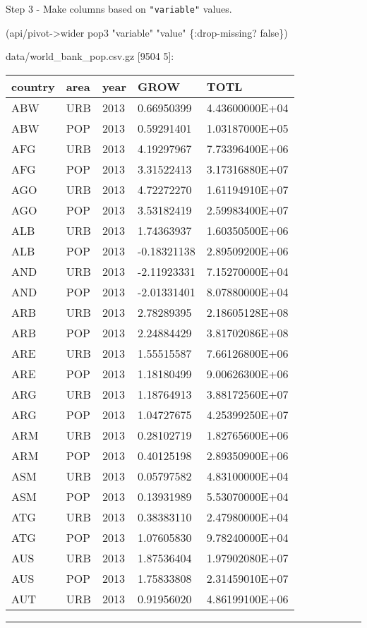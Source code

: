 \documentclass[]{article}
\newenvironment{Shaded}{\begin{snugshade}}{\end{snugshade}}
\newcommand{\AttributeTok}[1]{\textcolor[rgb]{0.77,0.63,0.00}{#1}}
\newcommand{\NormalTok}[1]{#1}
\newcommand{\StringTok}[1]{\textcolor[rgb]{0.31,0.60,0.02}{#1}}
\newcommand{\VariableTok}[1]{\textcolor[rgb]{0.00,0.00,0.00}{#1}}
\begin{document}
Step 3 - Make columns based on \texttt{"variable"} values.

\begin{Shaded}
\begin{Highlighting}[]
\NormalTok{(api/pivot->wider pop3 }\StringTok{"variable"} \StringTok{"value"}\NormalTok{ \{}\AttributeTok{:drop-missing}\NormalTok{? }\VariableTok{false}\NormalTok{\})}
\end{Highlighting}
\end{Shaded}

data/world\_bank\_pop.csv.gz {[}9504 5{]}:

\begin{longtable}[]{@{}lllll@{}}
\toprule
country & area & year & GROW & TOTL\tabularnewline
\midrule
\endhead
ABW & URB & 2013 & 0.66950399 & 4.43600000E+04\tabularnewline
ABW & POP & 2013 & 0.59291401 & 1.03187000E+05\tabularnewline
AFG & URB & 2013 & 4.19297967 & 7.73396400E+06\tabularnewline
AFG & POP & 2013 & 3.31522413 & 3.17316880E+07\tabularnewline
AGO & URB & 2013 & 4.72272270 & 1.61194910E+07\tabularnewline
AGO & POP & 2013 & 3.53182419 & 2.59983400E+07\tabularnewline
ALB & URB & 2013 & 1.74363937 & 1.60350500E+06\tabularnewline
ALB & POP & 2013 & -0.18321138 & 2.89509200E+06\tabularnewline
AND & URB & 2013 & -2.11923331 & 7.15270000E+04\tabularnewline
AND & POP & 2013 & -2.01331401 & 8.07880000E+04\tabularnewline
ARB & URB & 2013 & 2.78289395 & 2.18605128E+08\tabularnewline
ARB & POP & 2013 & 2.24884429 & 3.81702086E+08\tabularnewline
ARE & URB & 2013 & 1.55515587 & 7.66126800E+06\tabularnewline
ARE & POP & 2013 & 1.18180499 & 9.00626300E+06\tabularnewline
ARG & URB & 2013 & 1.18764913 & 3.88172560E+07\tabularnewline
ARG & POP & 2013 & 1.04727675 & 4.25399250E+07\tabularnewline
ARM & URB & 2013 & 0.28102719 & 1.82765600E+06\tabularnewline
ARM & POP & 2013 & 0.40125198 & 2.89350900E+06\tabularnewline
ASM & URB & 2013 & 0.05797582 & 4.83100000E+04\tabularnewline
ASM & POP & 2013 & 0.13931989 & 5.53070000E+04\tabularnewline
ATG & URB & 2013 & 0.38383110 & 2.47980000E+04\tabularnewline
ATG & POP & 2013 & 1.07605830 & 9.78240000E+04\tabularnewline
AUS & URB & 2013 & 1.87536404 & 1.97902080E+07\tabularnewline
AUS & POP & 2013 & 1.75833808 & 2.31459010E+07\tabularnewline
AUT & URB & 2013 & 0.91956020 & 4.86199100E+06\tabularnewline
\bottomrule
\end{longtable}

\begin{center}\rule{0.5\linewidth}{0.5pt}\end{center}
\end{document}
